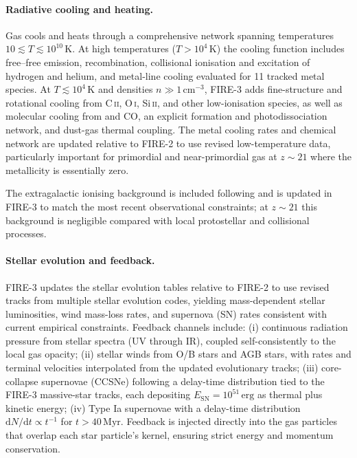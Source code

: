 \paragraph{Radiative cooling and heating.}
Gas cools and heats through a comprehensive network spanning temperatures
$10 \lesssim T \lesssim 10^{10}\,\mathrm{K}$.  At high temperatures
($T > 10^4\,\mathrm{K}$) the cooling function includes free--free emission,
recombination, collisional ionisation and excitation of hydrogen and helium,
and metal-line cooling evaluated for 11 tracked metal species.  At
$T \lesssim 10^4\,\mathrm{K}$ and densities $n \gg 1\,\mathrm{cm}^{-3}$,
FIRE-3 adds fine-structure and rotational cooling from
C\,\textsc{ii}, O\,\textsc{i}, Si\,\textsc{ii}, and other low-ionisation
species, as well as molecular cooling from  and CO, an explicit
 formation and photodissociation network, and dust-gas thermal
coupling.  The metal cooling rates and chemical network are updated relative
to FIRE-2 to use revised low-temperature data, particularly important for
primordial and near-primordial gas at $z\sim 21$ where the metallicity is
essentially zero.

The extragalactic ionising background is included following
\citet{Faucher-Giguere2020} and is updated in FIRE-3 to match the most
recent observational constraints; at $z\sim21$ this background is negligible
compared with local protostellar and collisional processes.

\paragraph{Stellar evolution and feedback.}
FIRE-3 updates the stellar evolution tables relative to FIRE-2 to use
revised tracks from multiple stellar evolution codes, yielding mass-dependent
stellar luminosities, wind mass-loss rates, and supernova (SN) rates
consistent with current empirical constraints.  Feedback channels include:
(i) continuous radiation pressure from stellar spectra (UV through IR), coupled
self-consistently to the local gas opacity;
(ii) stellar winds from O/B stars and AGB stars, with rates and terminal
velocities interpolated from the updated evolutionary tracks;
(iii) core-collapse supernovae (CCSNe) following a delay-time distribution
tied to the FIRE-3 massive-star tracks, each depositing $E_\mathrm{SN} =
10^{51}\,\mathrm{erg}$ as thermal plus kinetic energy;
(iv) Type Ia supernovae with a delay-time distribution
$\mathrm{d}N/\mathrm{d}t \propto t^{-1}$ for $t > 40\,\mathrm{Myr}$.
Feedback is injected directly into the gas particles that overlap each star
particle's kernel, ensuring strict energy and momentum conservation.

